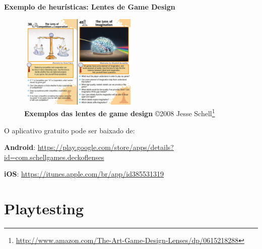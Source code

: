 \expandafter\documentclass\expandafter[table, usenames, svgnames, dvipsnames, \classopts]{beamer}
\begin{document}
\begin{frame}{\textbf{Exemplo de heurísticas: Lentes de Game Design}}

	\begin{figure}
		\includegraphics[height=4.5cm]{game-design-lenses}
		\caption{\tiny\textbf{Exemplos das lentes de game design} \copyright{2008} Jesse Schell\footnote{\url{http://www.amazon.com/The-Art-Game-Design-Lenses/dp/0615218288}}}
	\end{figure}

	\begin{block}{O aplicativo gratuito pode ser baixado de:}
        \begin{outline}
            \1 {\scriptsize \textbf{Android}: \url{https://play.google.com/store/apps/details?id=com.schellgames.deckoflenses}}
            
            \1 {\scriptsize \textbf{iOS}: \url{https://itunes.apple.com/br/app/id385531319}}
        \end{outline}
	\end{block}

	\vspace{1em}

\end{frame}

\section{Playtesting}
\end{document}
